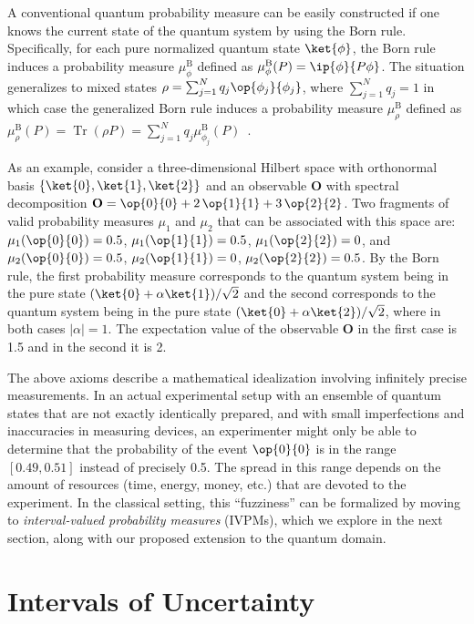 \documentclass[english,reprint, aps, prl,superscriptaddress, showpacs,
showkeys, longbibliography, amsmath, amssymb]{revtex4-1}
\theoremstyle{plain}
\theoremstyle{definition}
\newcommand{\proj}[1]{\op{#1}{#1}}
\newcommand{\Tr}{\ensuremath{\mathop{\mathrm{Tr}}\nolimits}}
\begin{document}
\noindent A conventional quantum probability measure can be easily
constructed if one knows the current state of the quantum system by
using the Born rule.  Specifically, for each pure normalized quantum
state $\ket{\phi}$, the Born rule induces a probability measure
$\mu_{\phi}^{\mathrm{B}}$ defined as
$\mu_{\phi}^{\mathrm{B}}(P)=\ip{\phi}{P\phi}$. The situation
generalizes to mixed states
$\rho = \sum_{j=1}^{N}q_{j}\proj{\phi_{j}}$, where
$\sum_{j=1}^{N}q_{j}=1$ in which case the generalized Born rule
induces a probability measure $\mu_{\rho}^{\mathrm{B}}$ defined as
$\mu_{\rho}^{\mathrm{B}}\left(P\right) = \Tr\left(\rho P\right) =
\sum_{j=1}^{N}
q_{j}\mu_{\phi_{j}}^{\mathrm{B}}\left(P\right)$~\cite{peres1995quantum,544199,Jaeger2007}.

As an example, consider a three-dimensional Hilbert space with
orthonormal basis $\{\ket{0},\ket{1},\ket{2}\}$ and an observable
$\mathbf{O}$ with spectral decomposition
$\mathbf{O} = \proj{0} + 2\,\proj{1} + 3\,\proj{2}$. Two fragments of
valid probability measures $\mu_1$ and $\mu_2$ that can be associated
with this space are: $\mu_1(\proj{0}) = 0.5$, $\mu_1(\proj{1}) = 0.5$,
$\mu_1(\proj{2}) = 0$, and $\mu_2(\proj{0}) = 0.5$,
$\mu_2(\proj{1}) = 0$, $\mu_2(\proj{2}) = 0.5$. By the Born rule, the
first probability measure corresponds to the quantum system being in
the pure state $(\ket{0}+\alpha\ket{1})/\sqrt{2}$ and the second
corresponds to the quantum system being in the pure state
$(\ket{0}+\alpha\ket{2})/\sqrt{2}$, where in both cases
$|\alpha|=1$. The expectation value of the observable $\mathbf{O}$ in
the first case is 1.5 and in the second it is 2.

The above axioms describe a mathematical idealization involving
infinitely precise measurements. In an actual experimental setup with
an ensemble of quantum states that are not exactly identically
prepared, and with small imperfections and inaccuracies in measuring
devices, an experimenter might only be able to determine that the
probability of the event $\proj{0}$ is in the range $[0.49,0.51]$
instead of precisely 0.5. The spread in this range depends on the
amount of resources (time, energy, money, etc.) that are devoted to
the experiment. In the classical setting, this ``fuzziness'' can be
formalized by moving to \emph{interval-valued probability measures}
(IVPMs), which we explore in the next section, along with our proposed
extension to the quantum domain.

\section{Intervals of Uncertainty}
\label{sec:Interval-Uncertainty}
\end{document}
